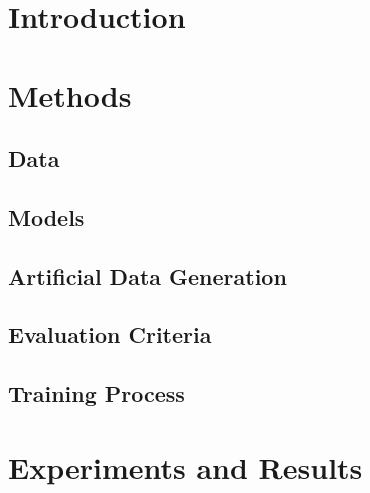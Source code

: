 \documentclass{article}
\begin{document}


\section{Introduction}

\section{Methods}
\subsection{Data}
\subsection{Models}
\subsection{Artificial Data Generation}
\subsection{Evaluation Criteria}

\subsection{Training Process}



\section{Experiments and Results}
\end{document}
